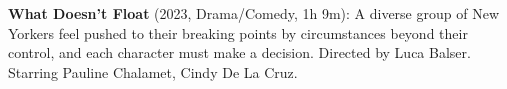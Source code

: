 \textbf{What Doesn't Float} (2023, Drama/Comedy, 1h 9m): A diverse group of New Yorkers feel pushed to their breaking points by circumstances beyond their control, and each character must make a decision. Directed by Luca Balser. Starring Pauline Chalamet, Cindy De La Cruz.